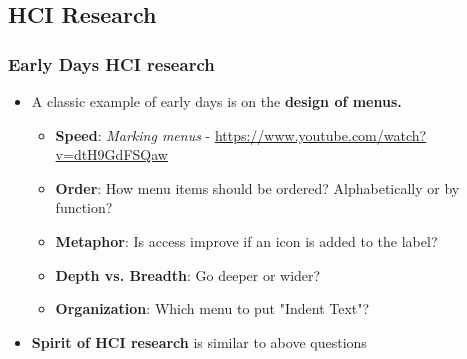 \documentclass{beamer}
\begin{document}
\subsection{HCI Research} %


\begin{frame}
\frametitle{Early Days HCI research}
\begin{itemize}
	\item A classic example of early days is on the \textbf{design of menus.}
	\begin{itemize}
		\item \textbf{Speed}: \textit{Marking menus} - \url{https://www.youtube.com/watch?v=dtH9GdFSQaw}
		\item \textbf{Order}: How menu items should be ordered?  Alphabetically or by function?
		\item \textbf{Metaphor}: Is access improve if an icon is added to the label?
		\item \textbf{Depth vs. Breadth}: Go deeper or wider?
		\item \textbf{Organization}: Which menu to put "Indent Text"?
	\end{itemize}
	\item \textbf{Spirit of HCI research} is similar to above questions %
\end{itemize}
\end{frame}
\end{document}

